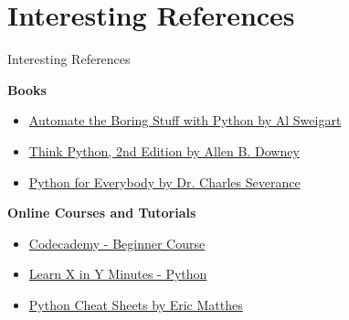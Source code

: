 \documentclass[
	11pt, 
]{beamer}
\begin{document}
\section{Interesting References}
\begin{frame}[fragile]{Interesting References}
\begin{exampleblock}{\textbf{Books}}
    
\begin{itemize}


\item \href{https://automatetheboringstuff.com/}{Automate the Boring Stuff with Python by Al Sweigart}

\item \href{http://greenteapress.com/thinkpython2/thinkpython2.pdf}{Think Python, 2nd Edition by Allen B. Downey}

\item \href{https://www.py4e.com/book.php}{Python for Everybody by Dr. Charles Severance}

\end{itemize}
\end{exampleblock}

\begin{exampleblock}{\textbf{Online Courses and Tutorials}}

\begin{itemize}

\item \href{https://www.codecademy.com/learn/learn-python-3}{Codecademy - Beginner Course}

\item \href{https://learnxinyminutes.com/docs/python/}{Learn X in Y Minutes - Python}

\item \href{https://ehmatthes.github.io/pcc_2e/cheat_sheets/cheat_sheets/}{Python Cheat Sheets by Eric Matthes}
\end{itemize}
\end{exampleblock}
\end{frame}





	
\end{document}
